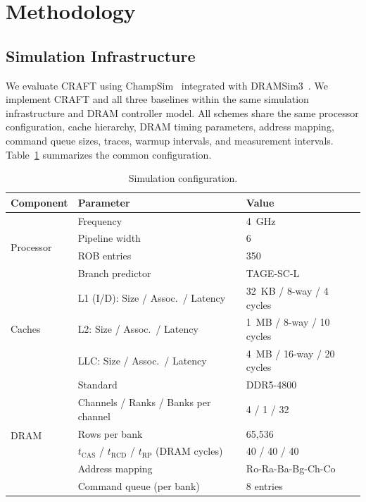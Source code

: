 \documentclass[runningheads]{llncs}
\begin{document}
\section{Methodology}
\label{sec:methodology}

\subsection{Simulation Infrastructure}

We evaluate CRAFT using ChampSim~\cite{Gober22} integrated with DRAMSim3~\cite{Li20}. We implement CRAFT and all three baselines within the same simulation infrastructure and DRAM controller model. All schemes share the same processor configuration, cache hierarchy, DRAM timing parameters, address mapping, command queue sizes, traces, warmup intervals, and measurement intervals. Table~\ref{tab:simconfig} summarizes the common configuration.

\begin{table}[!htbp]
\centering
\caption{Simulation configuration.}
\label{tab:simconfig}
\small
\begin{tabular}{l l p{5.0cm}}
\hline
\textbf{Component} & \textbf{Parameter} & \textbf{Value} \\
\hline
\multirow{4}{*}{Processor} & Frequency & 4~GHz \\
 & Pipeline width & 6 \\
 & ROB entries & 350 \\
 & Branch predictor & TAGE-SC-L \\
\hline
\multirow{3}{*}{Caches} & L1 (I/D): Size / Assoc.\ / Latency & 32~KB / 8-way / 4 cycles \\
 & L2: Size / Assoc.\ / Latency & 1~MB / 8-way / 10 cycles \\
 & LLC: Size / Assoc.\ / Latency & 4~MB / 16-way / 20 cycles \\
\hline
\multirow{6}{*}{DRAM} & Standard & DDR5-4800 \\
 & Channels / Ranks / Banks per channel & 4 / 1 / 32 \\
 & Rows per bank & 65,536 \\
 & $t_\mathrm{CAS}$ / $t_\mathrm{RCD}$ / $t_\mathrm{RP}$ (DRAM cycles) & 40 / 40 / 40 \\
 & Address mapping & Ro-Ra-Ba-Bg-Ch-Co \\
 & Command queue (per bank) & 8 entries \\
\hline
\end{tabular}
\end{table}
\end{document}
